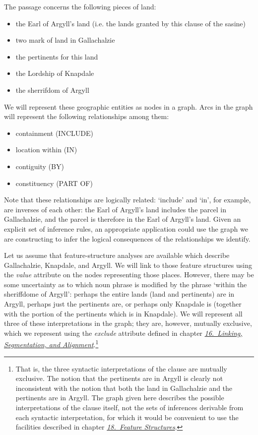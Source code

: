 The passage concerns the following pieces of land: \begin{itemize}
\item the Earl of Argyll's land (i.e. the lands granted by this clause of the sasine)
\item two mark of land in Gallachalzie
\item the pertinents for this land
\item the Lordship of Knapdale
\item the sherrifdom of Argyll
\end{itemize}  We will represent these geographic entities as nodes in a graph. Arcs in the graph will represent the following relationships among them: \begin{itemize}
\item containment (INCLUDE)
\item location within (IN)
\item contiguity (BY)
\item constituency (PART OF)
\end{itemize}  Note that these relationships are logically related: ‘include’ and ‘in’, for example, are inverses of each other: the Earl of Argyll's land includes the parcel in Gallachalzie, and the parcel is therefore in the Earl of Argyll's land. Given an explicit set of inference rules, an appropriate application could use the graph we are constructing to infer the logical consequences of the relationships we identify.\par
Let us assume that feature-structure analyses are available which describe Gallachalzie, Knapdale, and Argyll. We will link to those feature structures using the {\itshape value} attribute on the nodes representing those places. However, there may be some uncertainty as to which noun phrase is modified by the phrase ‘within the sheriffdome of Argyll’: perhaps the entire lands (land and pertinents) are in Argyll, perhaps just the pertinents are, or perhaps only Knapdale is (together with the portion of the pertinents which is in Knapdale). We will represent all three of these interpretations in the graph; they are, however, mutually exclusive, which we represent using the {\itshape exclude} attribute defined in chapter \textit{\hyperref[SA]{16.\ Linking, Segmentation, and Alignment}}.\footnote{That is, the three syntactic interpretations of the clause are mutually exclusive. The notion that the pertinents are in Argyll is clearly not inconsistent with the notion that both the land in Gallachalzie and the pertinents are in Argyll. The graph given here describes the possible interpretations of the clause itself, not the sets of inferences derivable from each syntactic interpretation, for which it would be convenient to use the facilities described in chapter \textit{\hyperref[FS]{18.\ Feature Structures}}.}\par
